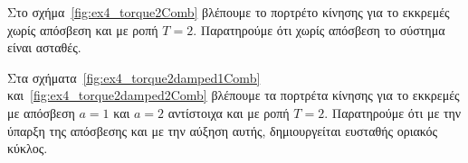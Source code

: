 \begin{solution}
    Στο σχήμα~\ref{fig:ex4_torque2Comb} βλέπουμε το πορτρέτο κίνησης για το
    εκκρεμές χωρίς απόσβεση και με ροπή \( T = 2 \). Παρατηρούμε ότι χωρίς
    απόσβεση το σύστημα είναι ασταθές.

    Στα σχήματα~\ref{fig:ex4_torque2damped1Comb}
    και~\ref{fig:ex4_torque2damped2Comb} βλέπουμε τα πορτρέτα κίνησης για το
    εκκρεμές με απόσβεση \( a = 1 \) και \( a = 2 \) αντίστοιχα και με ροπή
    \( T = 2 \). Παρατηρούμε ότι με την ύπαρξη της απόσβεσης και με την αύξηση
    αυτής, δημιουργείται ευσταθής οριακός κύκλος.
\end{solution}
